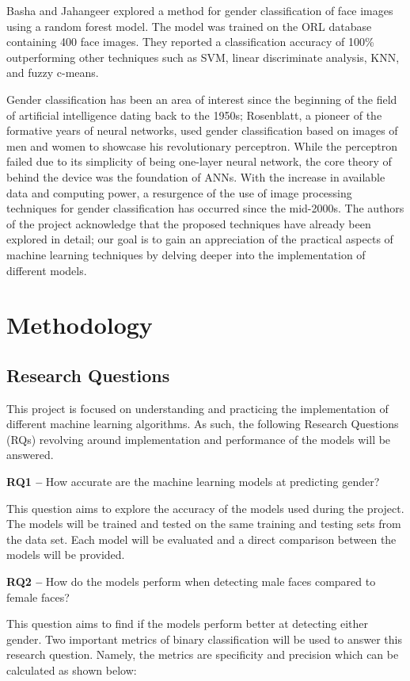 \documentclass[conference]{IEEEtran}
\begin{document}
Basha and Jahangeer\cite{basha2014exploring} explored a method for gender classification of face images using a random forest model. The model was trained on the ORL database containing 400 face images. They reported a classification accuracy of 100\% outperforming other techniques such as SVM, linear discriminate analysis, KNN, and fuzzy c-means.

Gender classification has been an area of interest since the beginning of the field of artificial intelligence dating back to the 1950s; Rosenblatt, a pioneer of the formative years of neural networks, used gender classification based on images of men and women to showcase his revolutionary perceptron\cite{widrow199030}. While the perceptron failed due to its simplicity of being one-layer neural network, the core theory of behind the device was the foundation of ANNs. With the increase in available data and computing power, a resurgence of the use of image processing techniques for gender classification has occurred since the mid-2000s. The authors of the project acknowledge that the proposed techniques have already been explored in detail; our goal is to gain an appreciation of the practical aspects of machine learning techniques by delving deeper into the implementation of different models.

\section{Methodology}
\subsection{Research Questions}
This project is focused on understanding and practicing the implementation of different machine
learning algorithms. As such, the following Research Questions (RQs) revolving around implementation
and performance of the models will be answered.

\textbf{RQ1 –} How accurate are the machine learning models at predicting gender?

This question aims to explore the accuracy of the models used during the project. The models will be
trained and tested on the same training and testing sets from the data set. Each model will be evaluated
and a direct comparison between the models will be provided.

\textbf{RQ2 –} How do the models perform when detecting male faces compared to female faces?

This question aims to find if the models perform better at detecting either gender. Two important
metrics of binary classification will be used to answer this research question. Namely, the metrics are
specificity and precision which can be calculated as shown below:
\end{document}
